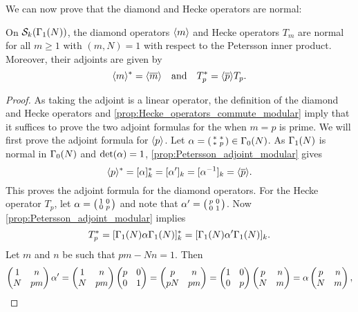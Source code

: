       We can now prove that the diamond and Hecke operators are normal:

      \begin{proposition}\label{prop:Hecke_operators_normal_modular}
        On $\mathcal{S}_{k}(\Gamma_{1}(N))$, the diamond operators $\langle m\rangle$ and Hecke operators $T_{m}$ are normal for all $m \ge 1$ with $(m,N) = 1$ with respect to the Petersson inner product. Moreover, their adjoints are given by
        \[
          \langle m\rangle^{\ast} = \langle\overline{m}\rangle \quad \text{and} \quad T_{p}^{\ast} = \langle\overline{p}\rangle T_{p}.
        \]
      \end{proposition}
      \begin{proof}
        As taking the adjoint is a linear operator, the definition of the diamond and Hecke operators and \cref{prop:Hecke_operators_commute_modular} imply that it suffices to prove the two adjoint formulas for the when $m = p$ is prime. We will first prove the adjoint formula for $\langle p\rangle$. Let $\alpha = \begin{psmallmatrix} * & * \\ * & p \end{psmallmatrix} \in \Gamma_{0}(N)$. As $\Gamma_{1}(N)$ is normal in $\Gamma_{0}(N)$ and $\det(\alpha) = 1$, \cref{prop:Petersson_adjoint_modular} gives
        \[
          \langle p\rangle^{\ast} = [\alpha]_{k}^{\ast} = [\alpha']_{k} = [\alpha^{-1}]_{k} = \langle\overline{p}\rangle.
        \]
        This proves the adjoint formula for the diamond operators. For the Hecke operator $T_{p}$, let $\alpha = \begin{psmallmatrix} 1 & 0 \\ 0 & p \end{psmallmatrix}$ and note that $\alpha' = \begin{psmallmatrix} p & 0 \\ 0 & 1 \end{psmallmatrix}$. Now \cref{prop:Petersson_adjoint_modular} implies
        \[
          T_{p}^{\ast} = [\Gamma_{1}(N)\alpha\Gamma_{1}(N)]_{k}^{\ast} = [\Gamma_{1}(N)\alpha'\Gamma_{1}(N)]_{k}.
        \]
        Let $m$ and $n$ be such that $pm-Nn = 1$. Then
        \[
          \begin{pmatrix} 1 & n \\ N & pm \end{pmatrix}\alpha' = \begin{pmatrix} 1 & n \\ N & pm \end{pmatrix}\begin{pmatrix} p & 0 \\ 0 & 1 \end{pmatrix} = \begin{pmatrix} p & n \\ pN & pm \end{pmatrix} = \begin{pmatrix} 1 & 0 \\ 0 & p \end{pmatrix}\begin{pmatrix} p & n \\ N & m \end{pmatrix} = \alpha\begin{pmatrix} p & n \\ N & m \end{pmatrix},
\]
\end{proof}
